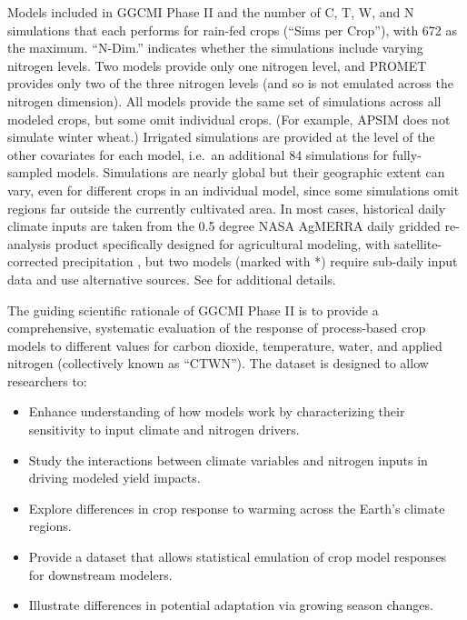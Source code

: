 \documentclass[preprint, 5p, times, twocolumn]{elsarticle}
\begin{document}
\begin{table}[!t]
 \caption{Models included in GGCMI Phase II and the number of C, T, W, and N simulations that each performs for rain-fed crops (``Sims per Crop''), with 672 as the maximum. ``N-Dim.'' indicates whether the simulations include varying nitrogen levels. Two models provide only one nitrogen level, and \dag PROMET provides only two of the three nitrogen levels (and so is not emulated across the nitrogen dimension). All models provide the same set of simulations across all modeled crops, but some omit individual crops. (For example, APSIM does not simulate winter wheat.) Irrigated simulations are provided at the level of the other covariates for each model, i.e.\ an additional 84 simulations for fully-sampled models. Simulations are nearly global but their geographic extent can vary, even for different crops in an individual model, since some simulations omit regions far outside the currently cultivated area. In most cases, historical daily climate inputs are taken from the 0.5 degree NASA AgMERRA daily gridded re-analysis product specifically designed for agricultural modeling, with satellite-corrected precipitation \citep{Ruane2015}, but two models (marked with *) require sub-daily input data and use alternative sources. See \citet{Elliott2015} for additional details.
 } 
\label{table:models}
\end{table}

The guiding scientific rationale of GGCMI Phase II is to provide a comprehensive, systematic evaluation of the response of process-based crop models to different values for carbon dioxide, temperature, water, and applied nitrogen (collectively known as ``CTWN'').
The dataset is designed to allow researchers to:
\begin{itemize}[noitemsep]
    \item Enhance understanding of how models work by characterizing their sensitivity to input climate and nitrogen drivers.
    \item Study the interactions between climate variables and nitrogen inputs in driving modeled yield impacts. 
    \item Explore differences in crop response to warming across the Earth's climate regions.
    \item Provide a dataset that allows statistical emulation of crop model responses for downstream modelers.
    \item Illustrate differences in potential adaptation via growing season changes. 
\end{itemize}
\end{document}

